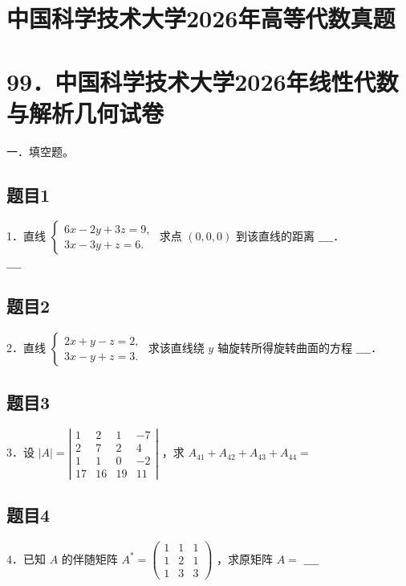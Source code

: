 \documentclass{article}
\begin{document}
\section*{中国科学技术大学2026年高等代数真题}
\section*{99．中国科学技术大学2026年线性代数与解析几何试卷}
一．填空题。\\

\subsection{题目1}
1．直线 \(\left\{\begin{array}{l}6 x-2 y+3 z=9, \\ 3 x-3 y+z=6 .\end{array}\right.\) 求点 \((0,0,0)\) 到该直线的距离 \(\_\_\_\_\)．\\
\(\_\_\_\_\)

\subsection{题目2}
2．直线 \(\left\{\begin{array}{l}2 x+y-z=2, \\ 3 x-y+z=3 .\end{array}\right.\) 求该直线绕 \(y\) 轴旋转所得旋转曲面的方程 \(\_\_\_\_\)．

\subsection{题目3}
3．设 \(|A|=\left|\begin{array}{cccc}1 & 2 & 1 & -7 \\ 2 & 7 & 2 & 4 \\ 1 & 1 & 0 & -2 \\ 17 & 16 & 19 & 11\end{array}\right|\) ，求 \(A_{41}+A_{42}+A_{43}+A_{44}=\)

\subsection{题目4}
4．已知 \(A\) 的伴随矩阵 \(A^{*}=\left(\begin{array}{lll}1 & 1 & 1 \\ 1 & 2 & 1 \\ 1 & 3 & 3\end{array}\right)\) ，求原矩阵 \(A=\) \(\_\_\_\_\)
\end{document}
